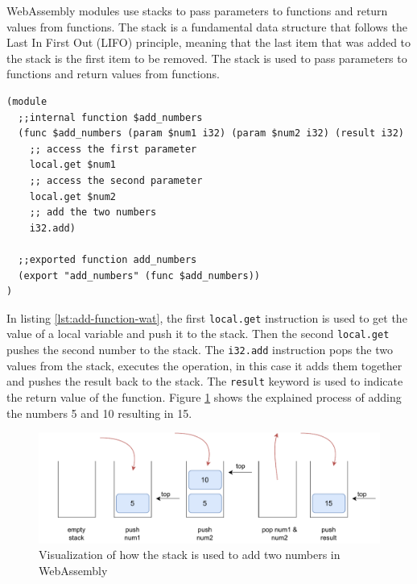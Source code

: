 WebAssembly modules use stacks \cite[sec. 4.2.14]{webassemblycommunitygroup_2023_webassembly} to pass parameters to functions and return values from functions. The stack is a fundamental data structure that follows the Last In First Out (LIFO) principle, meaning that the last item that was added to the stack is the first item to be removed. The stack is used to pass parameters to functions and return values from functions. 
%
\begin{lstlisting}[frame=lines, style=Wasm, caption={A simple functions that adds two numbers and returns the value}, showstringspaces=false, captionpos=b, label={lst:add-function-wat}]
(module
  ;;internal function $add_numbers
  (func $add_numbers (param $num1 i32) (param $num2 i32) (result i32)
    ;; access the first parameter
    local.get $num1
    ;; access the second parameter
    local.get $num2
    ;; add the two numbers
    i32.add)

  ;;exported function add_numbers
  (export "add_numbers" (func $add_numbers))
)
\end{lstlisting}
%
In listing \ref{lst:add-function-wat}, the first \texttt{local.get} instruction is used to get the value of a local variable and push it to the stack. Then the second \texttt{local.get} pushes the second number to the stack. The \texttt{i32.add} instruction pops the two values from the stack, executes the operation, in this case it adds them together and pushes the result back to the stack. The \texttt{result} keyword is used to indicate the return value of the function. Figure \ref{fig:stack_wasm_add_num} shows the explained process of adding the numbers 5 and 10 resulting in 15.

\begin{figure}[H]
  \centering
      \includegraphics[width=1\linewidth]{images/wasm/stack_add_num_wasm.drawio.pdf}
  \caption{Visualization of how the stack is used to add two numbers in WebAssembly}
  \label{fig:stack_wasm_add_num}
\end{figure}